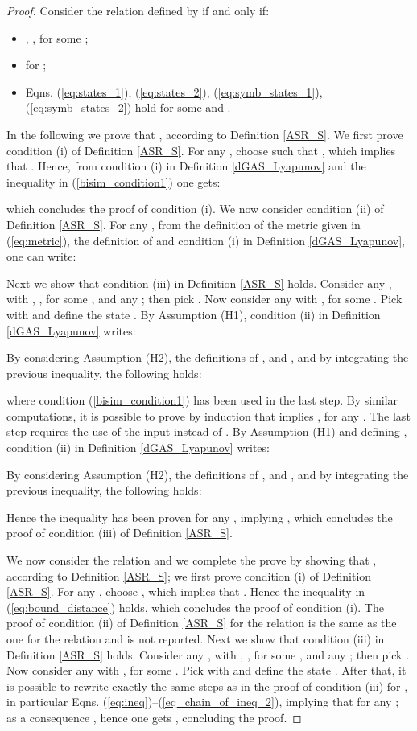 \documentclass{amsart}
\begin{document}
\begin{proof}
Consider the relation  defined by  if and only if:
\begin{itemize}
\item , , for some ;
\item  for ;
\item Eqns. (\ref{eq:states_1}), (\ref{eq:states_2}), (\ref{eq:symb_states_1}), (\ref{eq:symb_states_2}) hold for some  and .
\end{itemize}
In the following we prove that , according to Definition \ref{ASR_S}. We first prove condition (i) of Definition \ref{ASR_S}. For any , choose  such that , which implies that . Hence, from condition (i) in Definition \ref{dGAS_Lyapunov} and the inequality in (\ref{bisim_condition1}) one gets:

which concludes the proof of condition (i). We now consider condition (ii) of Definition \ref{ASR_S}. For any , from the definition of the metric given in (\ref{eq:metric}), the definition of  and condition (i) in Definition \ref{dGAS_Lyapunov}, one can write:

Next we show that condition (iii) in Definition \ref{ASR_S} holds. Consider any , with , , for some , and any ; then pick . Now consider any  with , for some . Pick  with  and define the state . 
By Assumption (H1), condition (ii) in Definition \ref{dGAS_Lyapunov} writes:


By considering Assumption (H2), the definitions of ,  and , and by integrating the previous inequality, the following holds:

where condition (\ref{bisim_condition1}) has been used in the last step. By similar computations, it is possible to prove by induction that  implies , for any . The last step  requires the use of the input  instead of . By Assumption (H1) and defining , condition (ii) in Definition \ref{dGAS_Lyapunov} writes:

By considering Assumption (H2), the definitions of ,  and , and by integrating the previous inequality, the following holds:

Hence the inequality  has been proven for any , implying , which concludes the proof of condition (iii) of Definition \ref{ASR_S}.

We now consider the relation  and we complete the prove by showing that , according to Definition \ref{ASR_S};  we first prove condition (i) of Definition \ref{ASR_S}. For any , choose , which implies that . Hence the inequality in (\ref{eq:bound_distance}) holds, which concludes the proof of condition (i). The proof of condition (ii) of Definition \ref{ASR_S} for the relation  is the same as the one for the relation  and is not reported. Next we show that condition (iii) in Definition \ref{ASR_S} holds. Consider any , with , , for some , and any ; then pick . Now consider any  with , for some . Pick  with  and define the state . After that, it is possible to rewrite exactly the same steps as in the proof of condition (iii) for , in particular Eqns. (\ref{eq:ineq})--(\ref{eq_chain_of_ineq_2}), implying that  for any ; as a consequence , hence one gets , concluding the proof.
\end{proof}
\end{document}
